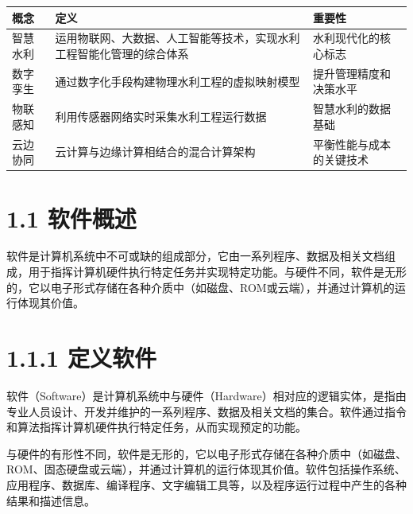 \documentclass[12pt,a4paper]{ctexbook}
\begin{document}
\begin{longtable}[]{@{}
  >{\raggedright\arraybackslash}p{}
  >{\raggedright\arraybackslash}p{}
  >{\raggedright\arraybackslash}p{}@{}}
\toprule\noalign{}
\begin{minipage}[b]{\linewidth}\raggedright
概念
\end{minipage} & \begin{minipage}[b]{\linewidth}\raggedright
定义
\end{minipage} & \begin{minipage}[b]{\linewidth}\raggedright
重要性
\end{minipage} \\
\midrule\noalign{}
\endhead
\bottomrule\noalign{}
\endlastfoot
智慧水利 &
运用物联网、大数据、人工智能等技术，实现水利工程智能化管理的综合体系 &
水利现代化的核心标志 \\
数字孪生 & 通过数字化手段构建物理水利工程的虚拟映射模型 &
提升管理精度和决策水平 \\
物联感知 & 利用传感器网络实时采集水利工程运行数据 &
智慧水利的数据基础 \\
云边协同 & 云计算与边缘计算相结合的混合计算架构 &
平衡性能与成本的关键技术 \\
\end{longtable}

\section{1.1 软件概述}\label{ux8f6fux4ef6ux6982ux8ff0}

软件是计算机系统中不可或缺的组成部分，它由一系列程序、数据及相关文档组成，用于指挥计算机硬件执行特定任务并实现特定功能。与硬件不同，软件是无形的，它以电子形式存储在各种介质中（如磁盘、ROM或云端），并通过计算机的运行体现其价值。


\section{1.1.1 定义软件}\label{ux5b9aux4e49ux8f6fux4ef6}

软件（Software）是计算机系统中与硬件（Hardware）相对应的逻辑实体，是指由专业人员设计、开发并维护的一系列程序、数据及相关文档的集合。软件通过指令和算法指挥计算机硬件执行特定任务，从而实现预定的功能。

与硬件的有形性不同，软件是无形的，它以电子形式存储在各种介质中（如磁盘、ROM、固态硬盘或云端），并通过计算机的运行体现其价值。软件包括操作系统、应用程序、数据库、编译程序、文字编辑工具等，以及程序运行过程中产生的各种结果和描述信息。
\end{document}
